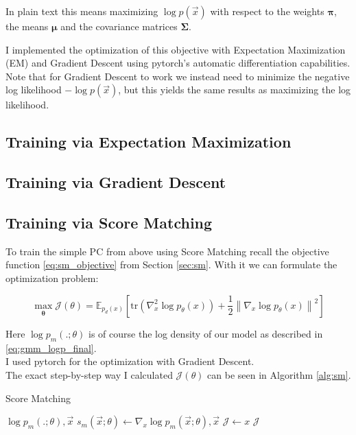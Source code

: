 In plain text this means maximizing $\log p(\vec x)$ with respect to the weights $\boldsymbol \pi$, the means $\boldsymbol \mu$ and the covariance matrices $\boldsymbol \Sigma$.

I implemented the optimization of this objective with Expectation Maximization (EM) and Gradient Descent using pytorch's 
automatic differentiation capabilities. 
Note that for Gradient Descent to work we instead need to minimize the negative log likelihood $- \log p(\vec x)$, 
but this yields the same results as maximizing the log likelihood.

\subsection{Training via Expectation Maximization}
\label{sec:gmm_em}

\subsection{Training via Gradient Descent}
\label{sec:gmm_sgd}

\subsection{Training via Score Matching}
\label{sec:gmm_sm}

To train the simple PC from above using Score Matching recall 
the objective function \ref{eq:sm_objective} from Section \ref{sec:sm}. 
With it we can formulate the optimization problem: 

\begin{equation}
    \max_{\substack{\boldsymbol \theta}} \mathcal{J}(\theta) = \mathbb{E}_{p_d(x)} \left[\text{tr} \left( \nabla_x^2 \log p_\theta(x) \right) + \frac{1}{2} \left\| \nabla_x \log p_\theta(x) \right\|^2 \right]
    \label{eq:sm_optimization_problem}
\end{equation}

Here $\log p_m(.;\theta)$ is of course the log density of our model as described in \ref{eq:gmm_logp_final}. \\
I used pytorch for the optimization with Gradient Descent. \\

The exact step-by-step way I calculated $\mathcal{J}(\theta)$ can be seen in Algorithm \ref{alg:sm}.

\begin{algorithm}
    \caption{Score Matching}
    \label{alg:sm}
    \begin{algorithmic}[1]  
        \Require $\log p_m(.;\theta), \vec x$
        \State $s_m(\vec x; \theta) \gets \nabla_x \log p_m(\vec x;\theta), \vec x$
        \State $\mathcal{J} \gets x$
        \State \Return $\mathcal{J}$
    \end{algorithmic}
\end{algorithm}


